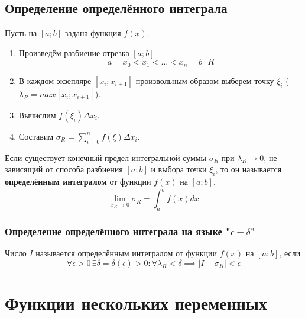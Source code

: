 \documentclass[12pt]{article}
\begin{document}
    \subsection{Определение определённого интеграла}
    Пусть на $[a;b]$ задана функция $f(x)$.
    \begin{enumerate}
        \item Произведём разбиение отрезка $[a;b]$ \[ a = x_0 < x_1 < \dots < x_n = b\,\,\,\, R \]
        \item В каждом экзепляре $[x_i; x_{i+1}]$ произвольным образом выберем точку $\xi_i$ ($\lambda_R = max[x_i; x_{i+1}]$).
        \item Вычислим $f(\xi_i)\Delta x_i$.
        \item Составим $\sigma_R = \sum_{i=0}^{n}f(\xi)\Delta x_i$.
    \end{enumerate}
    Если существует \underline{конечный} предел интегральной суммы $\sigma_R$ при $\lambda_R \to 0$, не зависящий от способа разбиения $[a; b]$ и выбора точки $\xi_i$, то он называется \textbf{определённым интегралом} от функции $f(x)$ на $[a;b]$.
    \[ \lim_{x_R \to 0}\sigma_R = \int_{a}^{b}f(x)dx \]
    \subsubsection*{Определение определённого интеграла на языке "$\epsilon-\delta$"}
    Число $I$ называется определённым интегралом от функции $f(x)$ на $[a;b]$, если
    \[ \forall \epsilon > 0\, \exists \delta = \delta(\epsilon) > 0 : \forall \lambda_R < \delta \implies |I-\sigma_R| < \epsilon \]



    \section{Функции нескольких переменных}
\end{document}
